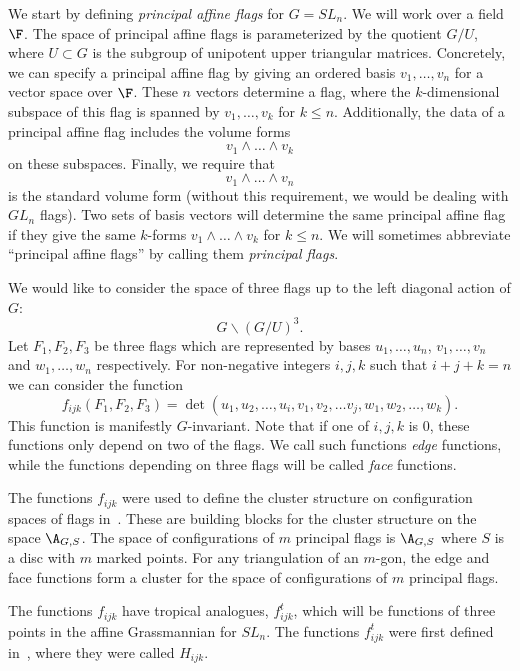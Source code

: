We start by defining \emph{principal affine flags} for $G=SL_n$. We will work over a field $\F$. The space of principal affine flags is parameterized by the quotient $G/U$, where $U \subset G$ is the subgroup of unipotent upper triangular matrices. Concretely, we can specify a principal affine flag by giving an ordered basis $v_1, \dots, v_n$ for a vector space over $\F$. These $n$ vectors determine a flag, where the $k$-dimensional subspace of this flag is spanned by $v_1, \dots , v_k$ for $k \leq n$. Additionally, the data of a principal affine flag includes the volume forms 
\[
 v_1 \wedge \dots \wedge v_k
\]
 on these subspaces. Finally, we require that 
\[
v_1 \wedge \dots \wedge v_n
\]
 is the standard volume form (without this requirement, we would be dealing with $GL_n$ flags). Two sets of basis vectors will determine the same principal affine flag if they give the same $k$-forms $v_1 \wedge \dots \wedge v_k$ for $k \leq n$. We will sometimes abbreviate ``principal affine flags'' by calling them \emph{principal flags}.

We would like to consider the space of three flags up to the left diagonal action of $G$:
\[
G \backslash (G/U)^3.
\]
Let $F_1, F_2, F_3$ be three flags which are represented by bases $u_1, \dots, u_n$, $v_1, \dots, v_n$ and $w_1, \dots, w_n$ respectively. For non-negative integers $i, j, k$ such that $i+j+k=n$ we can consider the function 
\[
f_{ijk}(F_1, F_2, F_3)=\det(u_1, u_2, \dots, u_i, v_1, v_2, \dots v_j, w_1, w_2, \dots, w_k).
\] 
This function is manifestly $G$-invariant. Note that if one of $i, j, k$ is $0$, these functions only depend on two of the flags. We call such functions {\em edge} functions, while the functions depending on three flags will be called {\em face} functions. 

\begin{rema} The functions $f_{ijk}$ were used to define the cluster structure on configuration spaces of flags in~\cite{FG1}. These are building blocks for the cluster structure on the space $\A_{G,S}$. The space of configurations of $m$ principal flags is $\A_{G,S}$ where $S$ is a disc with $m$ marked points. For any triangulation of an $m$-gon, the edge and face functions form a cluster for the space of configurations of $m$ principal flags.
\end{rema}

The functions $f_{ijk}$ have tropical analogues, $f_{ijk}^t$, which will be functions of three points in the affine Grassmannian for $SL_n$. The functions $f_{ijk}^t$ were first defined in~\cite{K}, where they were called $H_{ijk}$.

